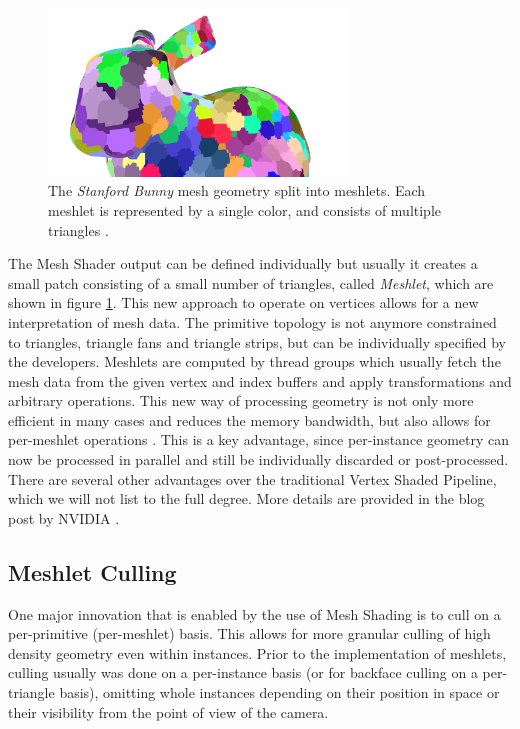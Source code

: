 \begin{figure}[h]
    \centering
    \includegraphics[width=300px]{images/graphics/bunny-meshlet.png}
    \caption{The \emph{Stanford Bunny} mesh geometry split into meshlets. Each meshlet is represented by a single color, 
    and consists of multiple triangles \cite{Oberberger2024}.}
    \label{fig:bunny-meshlet}
\end{figure}

\noindent
The Mesh Shader output can be defined individually but usually it creates a small patch consisting of a small 
number of triangles, called \emph{Meshlet}, which are shown in figure \ref{fig:bunny-meshlet}. This new approach 
to operate on vertices allows for a new interpretation of mesh data. The primitive topology is not anymore constrained 
to triangles, triangle fans and triangle strips, but can be individually specified by the developers.
Meshlets are computed by thread groups which usually fetch the mesh data from the given vertex and index buffers and 
apply transformations and arbitrary operations. This new way of processing geometry is not only more efficient in many 
cases and reduces the memory bandwidth, but also allows for per-meshlet operations \cite{Kubisch2020}. This is a key 
advantage, since per-instance geometry can now be processed in parallel and still be individually discarded or post-processed. 
There are several other advantages over the traditional Vertex Shaded Pipeline, which we will not list to the full 
degree. More details are provided in the blog post by NVIDIA \cite{Kubisch2020}.\\


\subsection{Meshlet Culling} \label{subsec-meshlet-culling}

One major innovation that is enabled by the use of Mesh Shading is to cull on a per-primitive (per-meshlet) basis. 
This allows for more granular culling of high density geometry even within instances. Prior to the implementation 
of meshlets, culling usually was done on a per-instance basis (or for backface culling on a per-triangle basis), 
omitting whole instances depending on their position in space or their visibility from the point of view of the camera.\\

